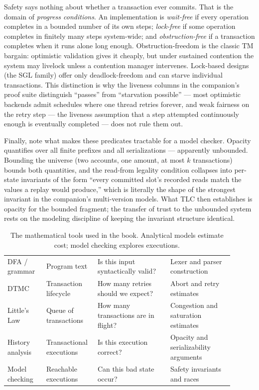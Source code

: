 Safety says nothing about whether a transaction ever commits. That is the domain of \emph{progress conditions}. An implementation is \emph{wait-free} if every operation completes in a bounded number of its own steps; \emph{lock-free} if some operation completes in finitely many steps system-wide; and \emph{obstruction-free} \cite{herlihy03obstructionfree} if a transaction completes when it runs alone long enough. Obstruction-freedom is the classic TM bargain: optimistic validation gives it cheaply, but under sustained contention the system may livelock unless a contention manager intervenes. Lock-based designs (the SGL family) offer only deadlock-freedom and can starve individual transactions. This distinction is why the liveness columns in the companion's proof suite distinguish ``passes'' from ``starvation possible'' --- most optimistic backends admit schedules where one thread retries forever, and weak fairness on the retry step --- the liveness assumption that a step attempted continuously enough is eventually completed --- does not rule them out.

Finally, note what makes these predicates tractable for a model checker. Opacity quantifies over all finite prefixes and all serializations --- apparently unbounded. Bounding the universe (two accounts, one amount, at most $k$ transactions) bounds both quantities, and the read-from legality condition collapses into per-state invariants of the form ``every committed slot's recorded reads match the values a replay would produce,'' which is literally the shape of the strongest invariant in the companion's multi-version models. What TLC then establishes is opacity for the bounded fragment; the transfer of trust to the unbounded system rests on the modeling discipline of keeping the invariant structure identical.


\begin{table}[htbp]
\centering
\begin{tabular}{M{0.16\linewidth}M{0.18\linewidth}M{0.30\linewidth}M{0.26\linewidth}}
\hline
{} &  &  &  \\
\hline
DFA / grammar & Program text & Is this input syntactically valid? & Lexer and parser construction \\
DTMC & Transaction lifecycle & How many retries should we expect? & Abort and retry estimates \\
Little's Law & Queue of transactions & How many transactions are in flight? & Congestion and saturation estimates \\
History analysis & Transactional executions & Is this execution correct? & Opacity and serializability arguments \\
Model checking & Reachable executions & Can this bad state occur? & Safety invariants and races \\
\hline
\end{tabular}
\caption{The mathematical tools used in the book. Analytical models estimate cost; model checking explores executions.}
\label{tab:math-tools}
\end{table}

